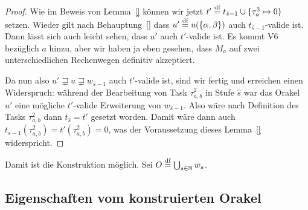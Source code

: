 \begin{proof}
Wie im Beweis von Lemma~\ref{} können wir jetzt $t'\stackrel{\text{df}}{=} t_{\hat{s}-1}\cup\{\tau^3_{a} \mapsto 0\}$ setzen.
Wieder gilt nach Behauptung~\ref{} dass $u'\stackrel{\text{df}}{=} u(\{\alpha, \beta\})$ auch $t_{\hat{s}-1}$-valide ist.
Dann lässt sich auch leicht sehen, dass $u'$ auch $t'$-valide ist. Es kommt V6 bezüglich $a$ hinzu, aber wir haben ja eben gesehen, dass $M_a$ auf zwei unterschiedlichen Rechenwegen definitiv akzeptiert.

Da nun also $u'\sqsupsetneq u \sqsupsetneq w_{\hat{s}-1}$ auch $t'$-valide ist, sind wir fertig und erreichen einen Widerspruch: während der Bearbeitung von Task $\tau^2_{a,b}$ in Stufe $\hat{s}$ war das Orakel $u'$ eine mögliche $t'$-valide Erweiterung von $w_{\hat{s}-1}$. Also wäre nach Definition des Tasks $\tau^2_{a,b}$ dann $t_{\hat{s}}=t'$ gesetzt worden.
Damit wäre dann auch $t_{s-1}(\tau^2_{a,b})=t'(\tau^2_{a,b})=0$, was der Voraussetzung dieses Lemma~\ref{} widerspricht.
\end{proof}

Damit ist die Konstruktion möglich. Sei $O\stackrel{\text{df}}{=} \bigcup_{s\in\mathbb N} w_s$.

\subsection*{Eigenschaften vom konstruierten Orakel}

